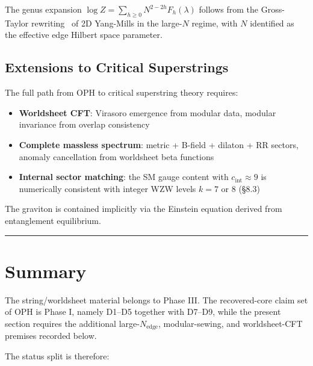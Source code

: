 The genus expansion \(\log Z = \sum_{h \geq 0} N^{2-2h} F_h(\lambda)\) follows from the Gross-Taylor rewriting~\cite{grossTaylor93} of 2D Yang-Mills in the large-\(N\) regime, with \(N\) identified as the effective edge Hilbert space parameter.

\subsection{Extensions to Critical Superstrings}\label{92-extensions-to-critical-superstrings}

The full path from OPH to critical superstring theory requires:

\begin{itemize}
\tightlist
\item
  \textbf{Worldsheet CFT}: Virasoro emergence from modular data, modular invariance from overlap consistency
\item
  \textbf{Complete massless spectrum}: metric + B-field + dilaton + RR sectors, anomaly cancellation from worldsheet beta functions
\item
  \textbf{Internal sector matching}: the SM gauge content with \(c_{\text{int}} \approx 9\) is numerically consistent with integer WZW levels \(k = 7\) or \(8\) (\S{}8.3)
\end{itemize}

The graviton is contained implicitly via the Einstein equation derived from entanglement equilibrium.

\begin{center}\rule{0.5\linewidth}{0.5pt}\end{center}

\section{Summary}\label{10-summary}

The string/worldsheet material belongs to Phase III. The recovered-core claim set of OPH is Phase
I, namely D1--D5 together with D7--D9, while the present section requires the additional
large-\(N_{\mathrm{edge}}\), modular-sewing, and worldsheet-CFT premises recorded below.

The status split is therefore:

